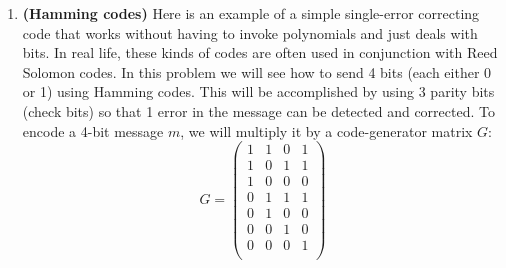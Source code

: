\documentclass[11pt]{article}
\begin{document}
\begin{enumerate}
\newpage

%
%



\item {\bf (Hamming codes)} Here is an example of a simple single-error correcting code that works without having to invoke polynomials and just deals with bits. In real life, these kinds of codes are often used in conjunction with Reed Solomon codes. In this problem we will see how to send 4 bits (each either 0 or 1) using Hamming codes. This will be accomplished by using 3 parity bits (check bits) so that 1 error in the message can be detected and corrected. To encode a 4-bit message $m$, we will multiply it by a code-generator matrix $G$:
\[ G = \left( \begin{array}{cccc} 1 & 1 & 0 & 1 \\
1 & 0 & 1 & 1 \\
1 & 0 & 0 & 0 \\
0 & 1 & 1 & 1 \\
0 & 1 & 0 & 0 \\
0 & 0 & 1 & 0 \\
0 & 0 & 0 & 1 \\
\end{array} \right)
\]   


\end{enumerate}
\end{document}
